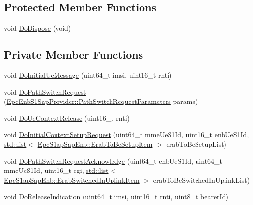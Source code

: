 \subsection*{Protected Member Functions}
\begin{DoxyCompactItemize}
\item 
void \hyperlink{classns3_1_1EpcEnbApplication_a4cf14ef748630fa2ad5f46f566e6a875}{Do\+Dispose} (void)
\end{DoxyCompactItemize}
\subsection*{Private Member Functions}
\begin{DoxyCompactItemize}
\item 
void \hyperlink{classns3_1_1EpcEnbApplication_abc06a1b9ceec48c11daa165a042f3707}{Do\+Initial\+Ue\+Message} (uint64\+\_\+t imsi, uint16\+\_\+t rnti)
\item 
void \hyperlink{classns3_1_1EpcEnbApplication_ab1edc81db1b49449b4547e3cdaca9693}{Do\+Path\+Switch\+Request} (\hyperlink{structns3_1_1EpcEnbS1SapProvider_1_1PathSwitchRequestParameters}{Epc\+Enb\+S1\+Sap\+Provider\+::\+Path\+Switch\+Request\+Parameters} params)
\item 
void \hyperlink{classns3_1_1EpcEnbApplication_a44ffeeb0373bcbdd2e06c33727938b99}{Do\+Ue\+Context\+Release} (uint16\+\_\+t rnti)
\item 
void \hyperlink{classns3_1_1EpcEnbApplication_a3a5fe01347001b0efa73e7352cf43972}{Do\+Initial\+Context\+Setup\+Request} (uint64\+\_\+t mme\+Ue\+S1\+Id, uint16\+\_\+t enb\+Ue\+S1\+Id, \hyperlink{openflow-interface_8h_afd9bcfa176617760671b67580f536fa7}{std\+::list}$<$ \hyperlink{structns3_1_1EpcS1apSap_1_1ErabToBeSetupItem}{Epc\+S1ap\+Sap\+Enb\+::\+Erab\+To\+Be\+Setup\+Item} $>$ erab\+To\+Be\+Setup\+List)
\item 
void \hyperlink{classns3_1_1EpcEnbApplication_a19d5434b52b3e1705b5d5ae342c6d2a2}{Do\+Path\+Switch\+Request\+Acknowledge} (uint64\+\_\+t enb\+Ue\+S1\+Id, uint64\+\_\+t mme\+Ue\+S1\+Id, uint16\+\_\+t cgi, \hyperlink{openflow-interface_8h_afd9bcfa176617760671b67580f536fa7}{std\+::list}$<$ \hyperlink{structns3_1_1EpcS1apSap_1_1ErabSwitchedInUplinkItem}{Epc\+S1ap\+Sap\+Enb\+::\+Erab\+Switched\+In\+Uplink\+Item} $>$ erab\+To\+Be\+Switched\+In\+Uplink\+List)
\item 
void \hyperlink{classns3_1_1EpcEnbApplication_a13824e3166e201a799dcb79ce51317bd}{Do\+Release\+Indication} (uint64\+\_\+t imsi, uint16\+\_\+t rnti, uint8\+\_\+t bearer\+Id)

\end{DoxyCompactItemize}
